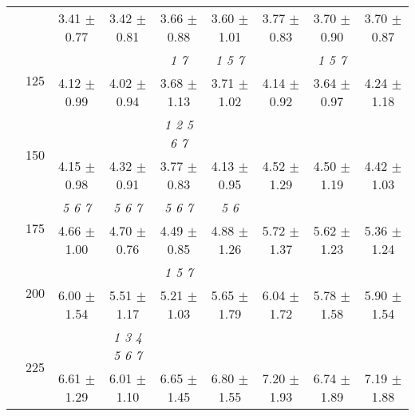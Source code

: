 \begin{table}[h]
{\begin{tabular}{
        ccccccccc}
 & & 3.41 $\pm$ 0.77& 3.42 $\pm$ 0.81& 3.66 $\pm$ 0.88& 3.60 $\pm$ 1.01& 3.77 $\pm$ 0.83& 3.70 $\pm$ 0.90& 3.70 $\pm$ 0.87 \\ 
 & \multirow{2}{*}{125}& \cellcolor[HTML]{EFEFEF} & \cellcolor[HTML]{EFEFEF} & \cellcolor[HTML]{EFEFEF} \textit{ 1 7 }& \cellcolor[HTML]{EFEFEF} \textit{ 1 5 7 }& \cellcolor[HTML]{EFEFEF} & \cellcolor[HTML]{EFEFEF} \textit{ 1 5 7 }& \cellcolor[HTML]{EFEFEF}  \\ 
 & & \cellcolor[HTML]{EFEFEF} 4.12 $\pm$ 0.99& \cellcolor[HTML]{EFEFEF} 4.02 $\pm$ 0.94& \cellcolor[HTML]{EFEFEF} 3.68 $\pm$ 1.13& \cellcolor[HTML]{EFEFEF} 3.71 $\pm$ 1.02& \cellcolor[HTML]{EFEFEF} 4.14 $\pm$ 0.92& \cellcolor[HTML]{EFEFEF} 3.64 $\pm$ 0.97& \cellcolor[HTML]{EFEFEF} 4.24 $\pm$ 1.18 \\ 
 & \multirow{2}{*}{150}& & & \textit{ 1 2 5 6 7 }& & & &  \\ 
 & & 4.15 $\pm$ 0.98& 4.32 $\pm$ 0.91& 3.77 $\pm$ 0.83& 4.13 $\pm$ 0.95& 4.52 $\pm$ 1.29& 4.50 $\pm$ 1.19& 4.42 $\pm$ 1.03 \\ 
 & \multirow{2}{*}{175}& \cellcolor[HTML]{EFEFEF} \textit{ 5 6 7 }& \cellcolor[HTML]{EFEFEF} \textit{ 5 6 7 }& \cellcolor[HTML]{EFEFEF} \textit{ 5 6 7 }& \cellcolor[HTML]{EFEFEF} \textit{ 5 6 }& \cellcolor[HTML]{EFEFEF} & \cellcolor[HTML]{EFEFEF} & \cellcolor[HTML]{EFEFEF}  \\ 
 & & \cellcolor[HTML]{EFEFEF} 4.66 $\pm$ 1.00& \cellcolor[HTML]{EFEFEF} 4.70 $\pm$ 0.76& \cellcolor[HTML]{EFEFEF} 4.49 $\pm$ 0.85& \cellcolor[HTML]{EFEFEF} 4.88 $\pm$ 1.26& \cellcolor[HTML]{EFEFEF} 5.72 $\pm$ 1.37& \cellcolor[HTML]{EFEFEF} 5.62 $\pm$ 1.23& \cellcolor[HTML]{EFEFEF} 5.36 $\pm$ 1.24 \\ 
 & \multirow{2}{*}{200}& & & \textit{ 1 5 7 }& & & &  \\ 
 & & 6.00 $\pm$ 1.54& 5.51 $\pm$ 1.17& 5.21 $\pm$ 1.03& 5.65 $\pm$ 1.79& 6.04 $\pm$ 1.72& 5.78 $\pm$ 1.58& 5.90 $\pm$ 1.54 \\ 
 & \multirow{2}{*}{225}& \cellcolor[HTML]{EFEFEF} & \cellcolor[HTML]{EFEFEF} \textit{ 1 3 4 5 6 7 }& \cellcolor[HTML]{EFEFEF} & \cellcolor[HTML]{EFEFEF} & \cellcolor[HTML]{EFEFEF} & \cellcolor[HTML]{EFEFEF} & \cellcolor[HTML]{EFEFEF}  \\ 
 & & \cellcolor[HTML]{EFEFEF} 6.61 $\pm$ 1.29& \cellcolor[HTML]{EFEFEF} 6.01 $\pm$ 1.10& \cellcolor[HTML]{EFEFEF} 6.65 $\pm$ 1.45& \cellcolor[HTML]{EFEFEF} 6.80 $\pm$ 1.55& \cellcolor[HTML]{EFEFEF} 7.20 $\pm$ 1.93& \cellcolor[HTML]{EFEFEF} 6.74 $\pm$ 1.89& \cellcolor[HTML]{EFEFEF} 7.19 $\pm$ 1.88 \\ 

\end{tabular}}
\end{table}
